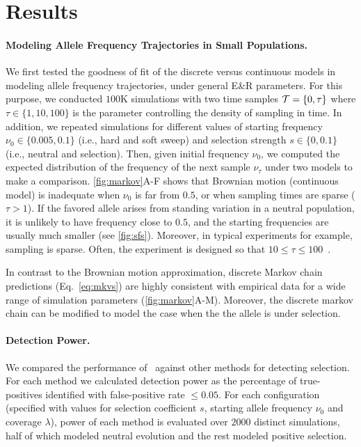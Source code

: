 \section{Results}
\paragraph{Modeling Allele Frequency Trajectories in Small Populations.} 
We first tested the goodness of fit of the discrete versus continuous models in 
modeling allele frequency trajectories, under general E\&R parameters.  For 
this 
purpose, we conducted $100$K
simulations with two time samples ${\cal T}=\{0,\tau\}$ where $\tau\in
\{1,10,100\}$ is the parameter controlling the density of sampling
in time.  In addition, we repeated simulations for different values of
starting frequency $\nu_0\in\{0.005,0.1\}$ (i.e., hard and soft sweep)
and selection strength $s\in\{0,0.1\}$ (i.e., neutral and
selection). Then, given initial frequency $\nu_0$, we computed
the expected distribution of the frequency of the next sample $\nu_\tau$
under two models to make a comparison.  \ref{fig:markov}A-F shows that
Brownian motion (continuous model) is inadequate when $\nu_0$ is
far from $0.5$, or when sampling times are sparse ($\tau>1$). If the
favored allele arises from standing variation in a neutral population,
it is unlikely to have frequency close to $0.5$, and the starting
frequencies are usually much smaller (see
\ref{fig:sfs}). Moreover, in typical \dmel experiments for
example, sampling is sparse. Often, the experiment is designed so that
$10\le\tau\le100$~\cite{kofler2013guide, orozco2012adaptation,
  zhou2011experimental,franssen2015patterns}.

In contrast to the Brownian motion approximation, discrete Markov
chain predictions (Eq.~\ref{eq:mkvs}) are highly consistent with
empirical data for a wide range of simulation parameters
(\ref{fig:markov}A-M). Moreover, the discrete markov chain can be
modified to model the case when the the allele is under
selection. 

\paragraph{Detection Power.} 
We compared the performance of \comale\ against other methods for
detecting selection. For each method we calculated detection power as the 
percentage of true-positives identified with false-positive rate $\le 0.05$. For 
each
configuration (specified with values for selection coefficient $s$,
starting allele frequency $\nu_0$ and coverage $\lambda$), power of each method 
is evaluated over $2000$ distinct simulations, half of which modeled neutral 
evolution
and the rest modeled positive selection.



